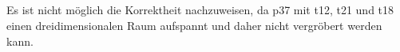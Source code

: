 \documentclass[10pt,a4paper,oneside,ngerman,numbers=noenddot]{scrartcl}
\begin{document}
\subsection{}
Es ist nicht möglich die Korrektheit nachzuweisen, da p37 mit t12, t21 und t18 einen dreidimensionalen Raum aufspannt und daher nicht vergröbert werden kann.
\section{} %
\end{document}
